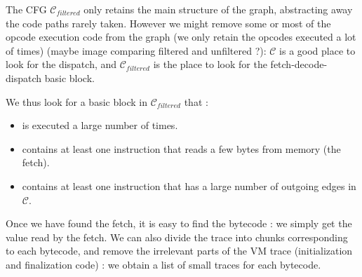 \documentclass[french]{article}
\begin{document}
The CFG $\mathcal{C}_{filtered}$ only retains the main structure of the graph, abstracting away the code paths rarely taken. However we might remove some or most of the opcode execution code from the graph (we only retain the opcodes executed a lot of times) (maybe image comparing filtered and unfiltered ?): $\mathcal{C}$ is a good place to look for the dispatch, and $\mathcal{C}_{filtered}$ is the place to look for the fetch-decode-dispatch basic block. 

We thus look for a basic block in $\mathcal{C}_{filtered}$ that :
\begin{itemize}
	\item is executed a large number of times.
	\item contains at least one instruction that reads a few bytes from memory (the fetch).
	\item contains at least one instruction that has a large number of outgoing edges in $\mathcal{C}$.
\end{itemize}

Once we have found the fetch, it is easy to find the bytecode : we simply get the value read by the fetch. We can also divide the trace into chunks corresponding to each bytecode, and remove the irrelevant parts of the VM trace (initialization and finalization code) : we obtain a list of small traces for each bytecode.
\end{document}
